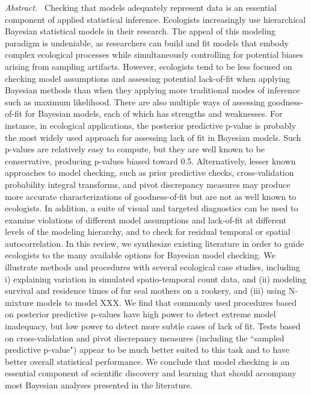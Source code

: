 \documentclass[12pt,english]{article}
\begin{document}
\begin{spacing}{1.9}
{\em Abstract.\ }  Checking that models adequately represent data is an essential component of applied statistical inference.  Ecologists increasingly use hierarchical Bayesian statistical models in their research.  The appeal of this modeling paradigm is undeniable, as researchers can build and fit models that embody complex ecological processes while simultaneously controlling for potential biases arising from sampling artifacts. However, ecologists tend to be less focused on checking model assumptions and assessing potential lack-of-fit when applying Bayesian methods than when they applying more traditional modes of inference such as maximum likelihood.  There are also multiple ways of assessing goodness-of-fit for Bayesian models, each of which has strengths and weaknesses.  For instance, in ecological applications, the posterior predictive p-value is probably the most widely used approach for assessing lack of fit in Bayesian models. Such p-values are relatively easy to compute, but they are well known to be conservative, producing p-values biased toward 0.5.  Alternatively, lesser known approaches to model checking, such as prior predictive checks, cross-validation probability integral transforms, and pivot discrepancy measures may produce more accurate characterizations of goodness-of-fit but are not as well known to ecologists.  In addition, a suite of visual and targeted diagnostics can be used to examine violations of different model assumptions and lack-of-fit at different levels of the modeling hierarchy, and to check for residual temporal or spatial autocorrelation.  In this review, we synthesize existing literature in order to guide ecologists to the many available options for Bayesian model checking.  We illustrate methods and procedures with several ecological case studies, including i) explaining variation in simulated spatio-temporal count data, and (ii) modeling survival and residence times of fur seal mothers on a rookery, and (iii) using N-mixture models to model XXX.  We find that commonly used procedures based on posterior predictive p-values have high power to detect extreme model inadequacy, but low power to detect more subtle cases of lack of fit.  Tests based on cross-validation and pivot discrepancy measures (including the ``sampled predictive p-value") appear to be much better suited to this task and to have better overall statistical performance. We conclude that model checking is an essential component of scientific discovery and learning that should accompany most Bayesian analyses presented in the literature.



\end{spacing}
\end{document}
